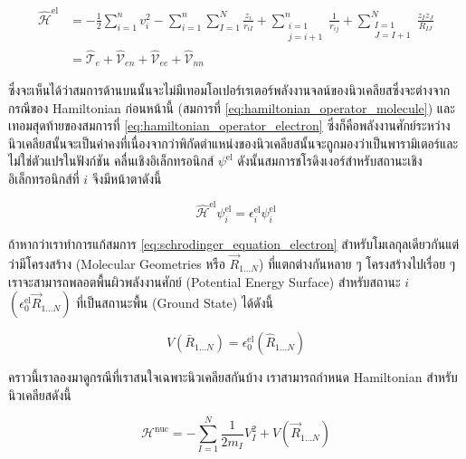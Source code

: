 \begin{equation}
    \label{eq:hamiltonian_operator_electron}
    \begin{aligned}
        \hat{\mathscr{H}}^{\mathrm{el}} 
        & = -\frac{1}{2} \sum_{i=1}^{n} v_{i}^{2} 
            - \sum_{i=1}^{n} \sum_{I=1}^{N} \frac{z_{i}}{r_{i I}} 
            + \sum_{\substack{i=1 \\ j=i+1}}^{n} \frac{1}{r_{i j}} 
            + \sum_{\substack{I=1 \\ J=I+1}}^{N} \frac{z_{I} z_{J}}{R_{I J}} \\
        & = \hat{\mathscr{T}}_{e} 
            + \hat{\mathscr{V}}_{en} 
            + \hat{\mathscr{V}}_{ee} 
            + \hat{\mathscr{V}}_{nn}
    \end{aligned}
\end{equation}

\noindent ซึ่งจะเห็นได้ว่าสมการด้านบนนั้นจะไม่มีเทอมโอเปอร์เรเตอร์พลังงานจลน์ของนิวเคลียสซึ่งจะต่างจากกรณีของ Hamiltonian ก่อนหน้านี้ 
(สมการที่ \ref{eq:hamiltonian_operator_molecule}) และเทอมสุดท้ายของสมการที่ \ref{eq:hamiltonian_operator_electron}
ซึ่งก็คือพลังงานศักย์ระหว่างนิวเคลียสนั้นจะเป็นค่าคงที่เนื่องจากว่าพิกัดตำแหน่งของนิวเคลียสนั้นจะถูกมองว่าเป็นพารามิเตอร์และไม่ใช่ตัวแปรในฟังก์ชัน%
คลื่นเชิงอิเล็กทรอนิกส์ $\psi^{\text{el}}$ ดังนั้นสมการชโรดิงเงอร์สำหรับสถานะเชิงอิเล็กทรอนิกส์ที่ $i$ จึงมีหน้าตาดังนี้

\begin{equation}
    \label{eq:schrodinger_equation_electron}
    \hat{\mathscr{H}}^{\text{el}} \psi^{\text{el}}_{i} = \epsilon^{\text{el}}_{i} \psi^{\text{el}}_{i}
\end{equation}

ถ้าหากว่าเราทำการแก้สมการ \ref{eq:schrodinger_equation_electron} สำหรับโมเลกุลเดียวกันแต่ว่ามีโครงสร้าง (Molecular Geometries
หรือ $\vec{R}_{1 \dots N}$) ที่แตกต่างกันหลาย ๆ โครงสร้างไปเรื่อย ๆ เราจะสามารถพลอตพื้นผิวพลังงานศักย์ (Potential Energy Surface) 
สำหรับสถานะ $i$ $(\epsilon^{\text{el}}_{0} \vec{R}_{1 \dots N})$ ที่เป็นสถานะพื้น (Ground State) ได้ดังนี้

\begin{equation}
    V\left(\bar{R}_{1 \dots N}\right) = \epsilon_{0}^{\mathrm{el}}\left(\hat{R}_{1 \dots N}\right)
\end{equation}

คราวนี้เราลองมาดูกรณีที่เราสนใจเฉพาะนิวเคลียสกันบ้าง เราสามารถกำหนด Hamiltonian สำหรับนิวเคลียสดังนี้

\begin{equation}
    \label{eq:hamiltonian_operator_nuclei}
    \mathcal{H}^{\text{nuc}} 
    = -\sum_{I=1}^{N} \frac{1}{2 m_{I}} V_{I}^{2} 
        + V\left(\vec{R}_{1 \dots N}\right)
\end{equation}

